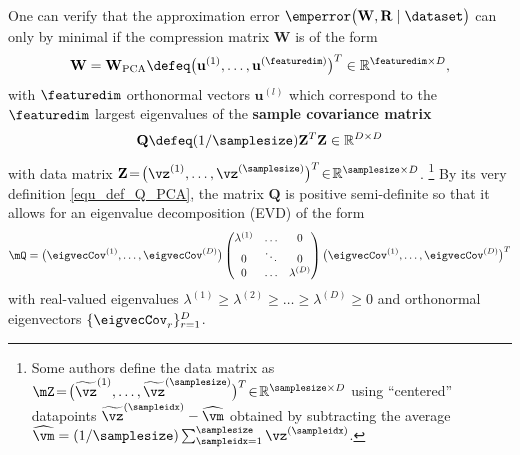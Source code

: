 \documentclass[12pt]{report}
\begin{document}
One can verify that the approximation error $\emperror \big( \mathbf{W},\mathbf{R} \mid \dataset\big)$ 
can only by minimal if the compression matrix $\mathbf{W}$ is of the form
\begin{equation}
\label{equ_def_PCA_W}
\mathbf{W} = \mathbf{W}_{\rm PCA} \defeq \big( \mathbf{u}^{(1)},\ldots, \mathbf{u}^{(\featuredim)} \big)^{T} \in \mathbb{R}^{\featuredim \times D}, 
\end{equation} 
with $\featuredim$ orthonormal vectors $\mathbf{u}^{(l)}$ which correspond to the 
$\featuredim$ largest eigenvalues of the {\bf sample covariance matrix} 
\begin{equation} 
\label{equ_def_Q_PCA}
\mathbf{Q} \defeq (1/\samplesize) \mathbf{Z}^{T} \mathbf{Z} \in \mathbb{R}^{D \times D} 
\end{equation}
with data matrix $\mathbf{Z}\!=\!\big( \vz^{(1)}, \ldots, \vz^{(\samplesize)} \big)^{T}\!\in\!\mathbb{R}^{\samplesize \times D}$.
\footnote{Some authors define the data matrix as $\mZ\!=\!\big( \widetilde{\vz}^{(1)}, \ldots, \widetilde{\vz}^{(\samplesize)} \big)^{T}\!\in\!\mathbb{R}^{\samplesize \times D}$  using ``centered'' datapoints $\widetilde{\vz}^{(\sampleidx)} - \widehat{\vm}$ 
	obtained by subtracting the average $\widehat{\vm} = (1/\samplesize) \sum_{\sampleidx=1}^{\samplesize} \vz^{(\sampleidx)}$.}
By its very definition \eqref{equ_def_Q_PCA}, the matrix $\mathbf{Q}$ is positive semi-definite so that it allows 
for an eigenvalue decomposition (EVD) of the form \cite{Strang2007}
\vspace*{-2mm}
\begin{equation}
\label{equ_EVD_Q_PCA}
 \mQ=\big(\eigvecCov^{(1)},\ldots,\eigvecCov^{(D)}\big)  \begin{pmatrix}\lambda^{(1)} &  \ldots & 0 \\ 0 & \ddots & 0  \\ 0 & \ldots & \lambda^{(D)} 
 \end{pmatrix} \big(\eigvecCov^{(1)},\ldots,\eigvecCov^{(D)}\big)^{T} \nonumber
\end{equation} 
with real-valued eigenvalues $\lambda^{(1)} \geq \lambda^{(2)}\geq \ldots \geq \lambda^{(D)} \geq 0$ and orthonormal 
eigenvectors $\{ \eigvecCov_{r} \}_{r=1}^{D}$. 
\end{document}
